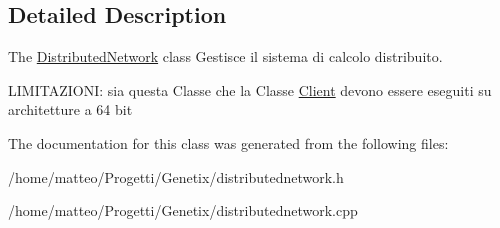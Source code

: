 \subsection{Detailed Description}
The \hyperlink{classDistributedNetwork}{Distributed\+Network} class Gestisce il sistema di calcolo distribuito. 

L\+I\+M\+I\+T\+A\+Z\+I\+O\+NI\+: sia questa Classe che la Classe \hyperlink{classClient}{Client} devono essere eseguiti su architetture a 64 bit 

The documentation for this class was generated from the following files\+:\begin{DoxyCompactItemize}
\item 
/home/matteo/\+Progetti/\+Genetix/distributednetwork.\+h\item 
/home/matteo/\+Progetti/\+Genetix/distributednetwork.\+cpp\end{DoxyCompactItemize}
